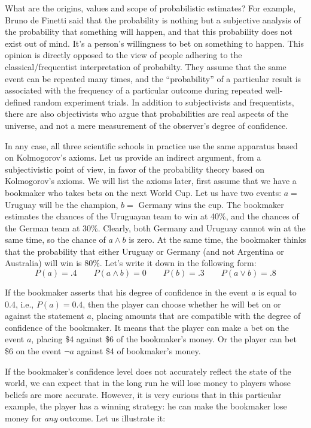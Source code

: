 \documentclass[notitlepage,oneside]{book}
\begin{document}
What are the origins, values and scope of probabilistic estimates? 
For example, Bruno de Finetti said that the probability is nothing but a subjective analysis of the probability that something will happen, 
and that this probability does not exist out of mind. 
It's a person's willingness to bet on something to happen. 
This opinion is directly opposed to the view of people adhering to the classical/frequentist interpretation of probabilty.
They assume that the same event can be repeated many times, and the ``probability'' of a particular result is associated with 
the frequency of a particular outcome during repeated well-defined random experiment trials.
In addition to subjectivists and frequentists, there are also objectivists who argue that probabilities are real aspects of the universe, 
and not a mere measurement of the observer's degree of confidence.

In any case, all three scientific schools in practice use the same apparatus based on Kolmogorov's axioms.
Let us provide an indirect argument, from a subjectivistic point of view, in favor of the probability theory based on Kolmogorov's axioms.
We will list the axioms later, first assume that we have a bookmaker who takes bets on the next World Cup. 
Let us have two events: $a=$ Uruguay will be the champion, $b=$ Germany wins the cup.
The bookmaker estimates the chances of the Uruguayan team to win at 40\%, and the chances of the German team at 30\%.
Clearly, both Germany and Uruguay cannot win at the same time, so the chance of $a\wedge b$ is zero. 
At the same time, the bookmaker thinks that the probability that either Uruguay or Germany (and not Argentina or Australia) will win is 80\%.
Let's write it down in the following form:
$$P(a) = .4  \qquad  P(a\wedge b) = 0 \qquad P(b) = .3 \qquad P(a\vee b) = .8$$
	
If the bookmaker asserts that his degree of confidence in the event $a$ is equal to 0.4, i.e., $P(a) = 0.4$, 
then the player can choose whether he will bet on or against the statement $a$,
placing amounts that are compatible with the degree of confidence of the bookmaker.
It means that the player can make a bet on the event $a$, placing \$4 against \$6 of the bookmaker's money.
Or the player can bet \$6 on the event $\neg a$ against \$4 of bookmaker's money.

If the bookmaker's confidence level does not accurately reflect the state of the world, 
we can expect that in the long run he will lose money to players whose beliefs are more accurate.
However, it is very curious that in this particular example, the player has a winning strategy: he can make the bookmaker lose money for \textit{any} outcome.
Let us illustrate it:
\end{document}
